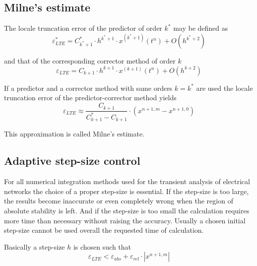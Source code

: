 \subsection{Milne's estimate}

The locale truncation error of the predictor of order $k^{*}$ may be
defined as
\begin{equation}
\varepsilon^{*}_{LTE} = C^{*}_{k^{*}+1}\cdot h^{k^{*}+1}\cdot x^{(k^{*}+1)}\left(t^n\right) + O\left(h^{k^{*}+2}\right)
\end{equation}

and that of the corresponding corrector method of order $k$
\begin{equation}
\varepsilon_{LTE} = C_{k+1}\cdot h^{k+1}\cdot x^{(k+1)}\left(t^n\right) + O\left(h^{k+2}\right)
\end{equation}

If a predictor and a corrector method with same orders $k = k^{*}$ are
used the locale truncation error of the predictor-corrector method
yields
\begin{equation}
\varepsilon_{LTE} \approx \dfrac{C_{k+1}}{C^{*}_{k+1} - C_{k+1}}\cdot \left(x^{n+1, m} - x^{n+1, 0}\right)
\end{equation}

This approximation is called Milne's estimate.

\subsection{Adaptive step-size control}
\label{sec:stepsize}

For all numerical integration methods used for the transient analysis
of electrical networks the choice of a proper step-size is essential.
If the step-size is too large, the results become inaccurate or even
completely wrong when the region of absolute stability is left.  And
if the step-size is too small the calculation requires more time than
necessary without raising the accuracy.  Usually a chosen initial
step-size cannot be used overall the requested time of calculation.

\addvspace{12pt}

Basically a step-size $h$ is chosen such that
\begin{equation}
\varepsilon_{LTE} < \varepsilon_{abs} + \varepsilon_{rel}\cdot \left|x^{n+1,m}\right|
\end{equation}

